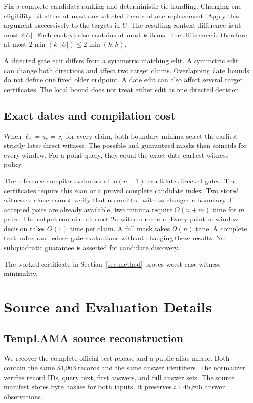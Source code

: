 Fix a complete candidate ranking and deterministic tie handling.
Changing one eligibility bit alters at most one selected item and one replacement.
Apply this argument successively to the targets in $U$.
The resulting context difference is at most $2|U|$.
Each context also contains at most $k$ items.
The difference is therefore at most $2\min(k,|U|)\leq2\min(k,h)$.

A directed gate edit differs from a symmetric matching edit.
A symmetric edit can change both directions and affect two target claims.
Overlapping date bounds do not define one fixed older endpoint.
A date edit can also affect several target certificates.
The local bound does not treat either edit as one directed decision.

\subsection{Exact dates and compilation cost}
When $\ell_c=u_c=x_c$ for every claim, both boundary minima select the earliest strictly later direct witness.
The possible and guaranteed masks then coincide for every window.
For a point query, they equal the exact-date earliest-witness policy.

The reference compiler evaluates all $n(n-1)$ candidate directed gates.
The certificates require this scan or a proved complete candidate index.
Two stored witnesses alone cannot verify that no omitted witness changes a boundary.
If accepted pairs are already available, two minima require $O(n+m)$ time for $m$ pairs.
The output contains at most $2n$ witness records.
Every point or window decision takes $O(1)$ time per claim.
A full mask takes $O(n)$ time.
A complete text index can reduce gate evaluations without changing these results.
No subquadratic guarantee is asserted for candidate discovery.

The worked certificate in Section~\ref{sec:method} proves worst-case witness minimality.

\section{Source and Evaluation Details}
\label{app:source-audit}

\subsection{TempLAMA source reconstruction}
We recover the complete official test release and a public alias mirror.
Both contain the same 34,963 records and the same answer identifiers.
The normalizer verifies record IDs, query text, first answers, and full answer sets.
The source manifest stores byte hashes for both inputs.
It preserves all 45,866 answer observations.

